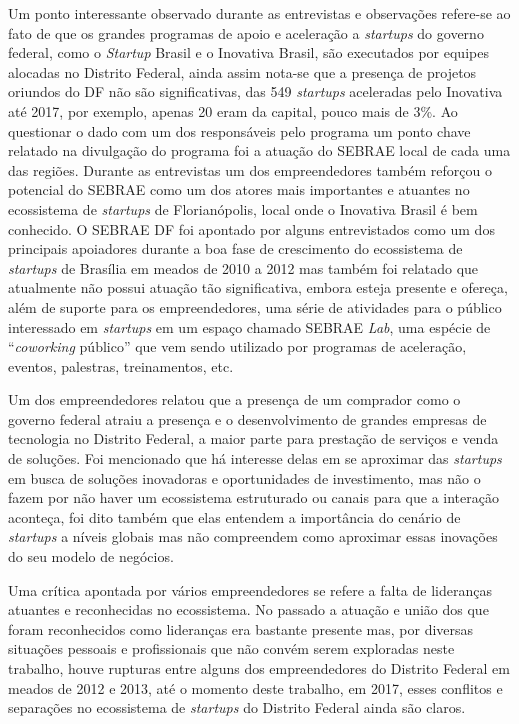 Um ponto interessante observado durante as entrevistas e observações refere-se ao fato de que os grandes programas de apoio e aceleração a \textit{startups} do governo federal, como o \textit{Startup} Brasil e o Inovativa Brasil, são executados por equipes alocadas no Distrito Federal, ainda assim nota-se que a presença de projetos oriundos do DF não são significativas, das 549 \textit{startups} aceleradas pelo Inovativa até 2017, por exemplo, apenas 20 eram da capital, pouco mais de 3\%. Ao questionar o dado com um dos responsáveis pelo programa um ponto chave relatado na divulgação do programa foi a atuação do SEBRAE local de cada uma das regiões. Durante as entrevistas um dos empreendedores também reforçou o potencial do SEBRAE como um dos atores mais importantes e atuantes no ecossistema de \textit{startups} de Florianópolis, local onde o Inovativa Brasil é bem conhecido. O SEBRAE DF foi apontado por alguns entrevistados como um dos principais apoiadores durante a boa fase de crescimento do ecossistema de \textit{startups} de Brasília em meados de 2010 a 2012 mas também foi relatado que atualmente não possui atuação tão significativa, embora esteja presente e ofereça, além de suporte para os empreendedores, uma série de atividades para o público interessado em \textit{startups} em um espaço chamado SEBRAE \textit{Lab}, uma espécie de ``\textit{coworking} público'' que vem sendo utilizado por programas de aceleração, eventos, palestras, treinamentos, etc.

Um dos empreendedores relatou que a presença de um comprador como o governo federal atraiu a presença e o desenvolvimento de grandes empresas de tecnologia no Distrito Federal, a maior parte para prestação de serviços e venda de soluções. Foi mencionado que há interesse delas em se aproximar das \textit{startups} em busca de soluções inovadoras e oportunidades de investimento, mas não o fazem por não haver um ecossistema estruturado ou canais para que a interação aconteça, foi dito também que elas entendem a importância do cenário de \textit{startups} a níveis globais mas não compreendem como aproximar essas inovações do seu modelo de negócios. 

Uma crítica apontada por vários empreendedores se refere a falta de lideranças atuantes e reconhecidas no ecossistema. No passado a atuação e união dos que foram reconhecidos como lideranças era bastante presente mas, por diversas situações pessoais e profissionais que não convém serem exploradas neste trabalho, houve rupturas entre alguns dos empreendedores do Distrito Federal em meados de 2012 e 2013, até o momento deste trabalho, em 2017, esses conflitos e separações no ecossistema de \textit{startups} do Distrito Federal ainda são claros. 

